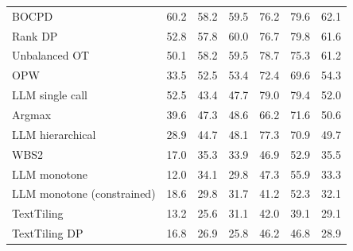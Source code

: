 \begin{table}[t]
\begin{tabular*}{\linewidth}{@{\extracolsep{\fill}}lrrrrrr@{}}
BOCPD & 60.2 & 58.2 & 59.5 & 76.2 & 79.6 & 62.1 \\
Rank DP & 52.8 & 57.8 & 60.0 & 76.7 & 79.8 & 61.6 \\
Unbalanced OT & 50.1 & 58.2 & 59.5 & 78.7 & 75.3 & 61.2 \\
OPW & 33.5 & 52.5 & 53.4 & 72.4 & 69.6 & 54.3 \\
LLM single call & 52.5 & 43.4 & 47.7 & 79.0 & 79.4 & 52.0 \\
Argmax & 39.6 & 47.3 & 48.6 & 66.2 & 71.6 & 50.6 \\
LLM hierarchical & 28.9 & 44.7 & 48.1 & 77.3 & 70.9 & 49.7 \\
WBS2 & 17.0 & 35.3 & 33.9 & 46.9 & 52.9 & 35.5 \\
LLM monotone & 12.0 & 34.1 & 29.8 & 47.3 & 55.9 & 33.3 \\
LLM monotone (constrained) & 18.6 & 29.8 & 31.7 & 41.2 & 52.3 & 32.1 \\
TextTiling & 13.2 & 25.6 & 31.1 & 42.0 & 39.1 & 29.1 \\
TextTiling DP & 16.8 & 26.9 & 25.8 & 46.2 & 46.8 & 28.9 \\
\bottomrule
\end{tabular*}
\end{table}
